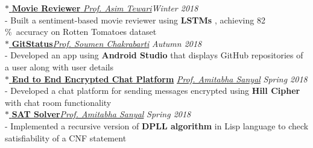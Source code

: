 \documentclass[10pt]{article}
\begin{document}
$\ast$\href{https://github.com/yashkhem1/Movie-Reviewer---Sentiment-Analysis}{ \textbf{  Movie Reviewer } } \textemdash \textit{ \href{https://www.asimtewari.com/}{Prof. Asim Tewari}}\hfill{\sl \small Winter 2018} \vspace{1pt}\\
- Built a sentiment-based  movie reviewer using {\bf LSTMs} , achieving 82 \%\ accuracy on Rotten Tomatoes dataset \vspace{5pt}\\
$\ast$\href{https://github.com/yashkhem1/GitStatus}{\textbf{ GitStatus}}\textemdash \textit{\href{https://www.cse.iitb.ac.in/~soumen/}{Prof. Soumen Chakrabarti} }\hfill{\sl \small Autumn 2018} \vspace{1pt}\\
- Developed an app using {\bf Android Studio} that displays GitHub repositories of a user along with user details \vspace{5pt}\\
$\ast$\href{https://github.com/yashkhem1/Encrypted-Chat-Platform}{\textbf{ End to End Encrypted Chat Platform}} \textemdash \textit{ \href{https://www.cse.iitb.ac.in/~as/}{Prof. Amitabha Sanyal} } \hfill{\sl \small Spring 2018} \vspace{1pt} \\
- Developed a chat platform for sending messages encrypted using {\bf Hill Cipher} with chat room functionality \vspace{5pt}\\
$\ast$\href{https://github.com/yashkhem1/Abstractions-and-Paradigms-Assignments}{\textbf{ SAT Solver}}\textemdash \textit{\href{https://www.cse.iitb.ac.in/~as/}{Prof. Amitabha Sanyal} }\hfill{\sl \small Spring 2018} \vspace{1pt}\\
- Implemented a recursive version of {\bf DPLL algorithm} in Lisp language to check satisfiability of a CNF statement\vspace{5pt}\\
\vspace{-10pt}
\end{document}
